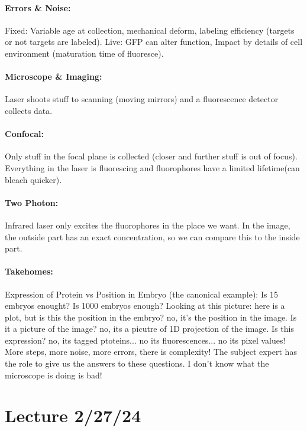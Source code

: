 \documentclass[../main.tex]{subfiles}
\begin{document}
\paragraph*{Errors \& Noise:} Fixed: Variable age at collection, mechanical deform, labeling efficiency
(targets or not targets are labeled). Live: GFP can alter function, Impact by details of cell
environment (maturation time of fluoresce). 

\paragraph*{Microscope \& Imaging:} Laser shoots stuff to scanning (moving mirrors) and a
fluorescence detector collects data. 

\paragraph*{Confocal:} Only stuff in the focal plane is collected (closer and further stuff is out
of focus). Everything in the laser is fluorescing and fluorophores have a limited lifetime(can 
bleach quicker).

\paragraph*{Two Photon:} Infrared laser only excites the fluorophores in the place we want. In the
image, the outside part has an exact concentration, so we can compare this to the inside part.

\paragraph*{Takehomes:} Expression of Protein vs Position in Embryo (the canonical example): Is
15 embryos enought? Is 1000 embryos enough? Looking at this picture: here is a plot, but is this
the position in the embryo? no, it's the position in the image. Is it a picture of the image? no,
its a picutre of 1D projection of the image. Is this expression? no, its tagged ptoteins... no its
fluorescences... no its pixel values! More steps, more noise, more errors, there is complexity! 
The subject expert has the role to give us the answers to these questions. I don't know what the
microscope is doing is bad!

\newpage
\section*{Lecture 2/27/24}
\barh \vspace{10px}
\end{document}
